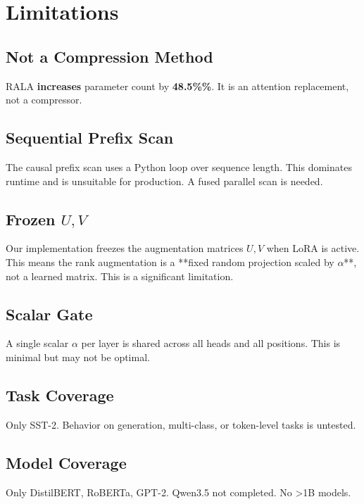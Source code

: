 
\section{Limitations}

\subsection{Not a Compression Method}

RALA \textbf{increases} parameter count by \textbf{48.5\%\%}. It is an 
attention replacement, not a compressor.

\subsection{Sequential Prefix Scan}

The causal prefix scan uses a Python loop over sequence length. This 
dominates runtime and is unsuitable for production. A fused parallel scan 
is needed.

\subsection{Frozen $U, V$}

Our implementation freezes the augmentation matrices $U, V$ when LoRA is 
active. This means the rank augmentation is a **fixed random projection 
scaled by $\alpha$**, not a learned matrix. This is a significant 
limitation.

\subsection{Scalar Gate}

A single scalar $\alpha$ per layer is shared across all heads and all 
positions. This is minimal but may not be optimal.

\subsection{Task Coverage}

Only SST-2. Behavior on generation, multi-class, or token-level tasks is 
untested.

\subsection{Model Coverage}

Only DistilBERT, RoBERTa, GPT-2. Qwen3.5 not completed. No >1B models.

